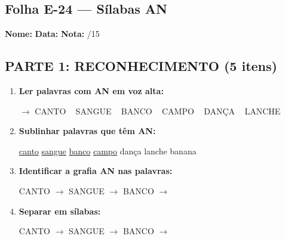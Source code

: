 \subsection{Folha E-24 --- Sílabas AN}
\begin{exercicio}



\noindent\textbf{Nome:} \underline{\hspace{3.2cm}} \quad \textbf{Data:} \underline{\hspace{1.6cm}} \quad \textbf{Nota:} \underline{\hspace{0.9cm}}/15


\subsection*{PARTE 1: RECONHECIMENTO (5 itens)}

\begin{enumerate}

  \item \textbf{Ler palavras com AN em voz alta:}
  \begin{center}
  $\rightarrow$ CANTO ~ SANGUE ~ BANCO ~ CAMPO ~ DANÇA ~ LANCHE
  \end{center}

  \item \textbf{Sublinhar palavras que têm AN:}

\begin{center}
  \uline{canto} \quad \uline{sangue} \quad \uline{banco} \quad \uline{campo} \quad dança \quad lanche \quad banana
\end{center}

  \item \textbf{Identificar a grafia AN nas palavras:}
  \begin{center}
  CANTO $\rightarrow$ \underline{\hspace{1cm}} \quad SANGUE $\rightarrow$ \underline{\hspace{1cm}} \quad BANCO $\rightarrow$ \underline{\hspace{1cm}}
  \end{center}

  \item \textbf{Separar em sílabas:}
  \begin{center}
  CANTO $\rightarrow$ \underline{\hspace{1.2cm}} \quad SANGUE $\rightarrow$ \underline{\hspace{1.2cm}} \quad BANCO $\rightarrow$ \underline{\hspace{1.2cm}}
  \end{center}


\end{enumerate}
\end{exercicio}
